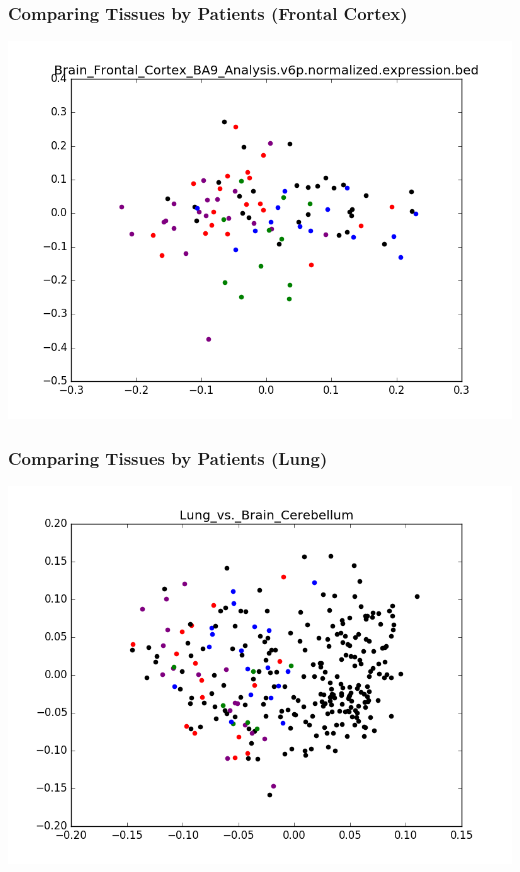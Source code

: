 \documentclass{beamer}
\begin{document}
\begin{frame} \frametitle{Comparing Tissues by Patients (Frontal Cortex)}
\includegraphics[scale=0.4]{Cerebellum_x_Frontal_Cortex.png}
\end{frame}

\begin{frame} \frametitle{Comparing Tissues by Patients (Lung)}
\includegraphics[scale=0.56]{Cerebellum_x_Lung.png}
\end{frame}
\end{document}
